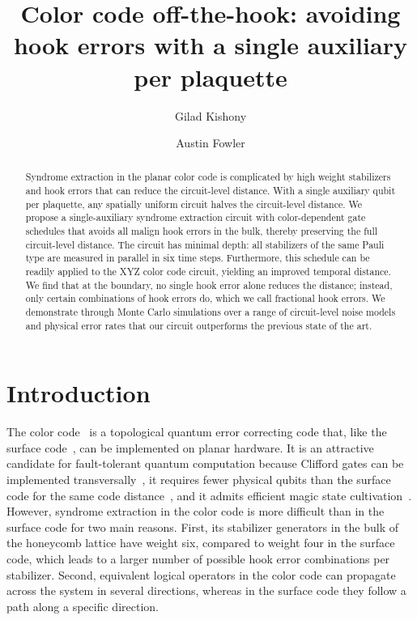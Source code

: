 \documentclass[twocolumn,
aps,
prx,
showpacs,
amsmath,
amssymb,
floatfix,
longbibliography,
superscriptaddress,
eprint]
{revtex4-1}
\begin{document}
\title{Color code off-the-hook: avoiding hook errors with a single auxiliary per plaquette}

\author{Gilad Kishony}
\author{Austin Fowler}

\begin{abstract}

Syndrome extraction in the planar color code is complicated by high weight stabilizers and hook errors that can reduce the circuit-level distance.
With a single auxiliary qubit per plaquette, any spatially uniform circuit halves the circuit-level distance.
We propose a single-auxiliary syndrome extraction circuit with color-dependent gate schedules that avoids all malign hook errors in the bulk, thereby preserving the full circuit-level distance.
The circuit has minimal depth: all stabilizers of the same Pauli type are measured in parallel in six time steps. 
Furthermore, this schedule can be readily applied to the XYZ color code circuit, yielding an improved temporal distance.
We find that at the boundary, no single hook error alone reduces the distance; instead, only certain combinations of hook errors do, which we call fractional hook errors.
We demonstrate through Monte Carlo simulations over a range of circuit-level noise models and physical error rates that our circuit outperforms the previous state of the art.

\end{abstract}

\maketitle

\section{Introduction}
\label{sec:intro}

The color code~\cite{bombin2006color} is a topological quantum error correcting code that, like the surface code~\cite{dennis2002topological, fowler2012surface}, can be implemented on planar hardware.
It is an attractive candidate for fault-tolerant quantum computation because Clifford gates can be implemented transversally~\cite{bombin2006color}, it requires fewer physical qubits than the surface code for the same code distance~\cite{Thomsen_2024}, and it admits efficient magic state cultivation~\cite{gidney2024magicstatecultivationgrowing}.
However, syndrome extraction in the color code is more difficult than in the surface code for two main reasons.
First, its stabilizer generators in the bulk of the honeycomb lattice have weight six, compared to weight four in the surface code, which leads to a larger number of possible hook error combinations per stabilizer.
Second, equivalent logical operators in the color code can propagate across the system in several directions, whereas in the surface code they follow a path along a specific direction.
\end{document}
